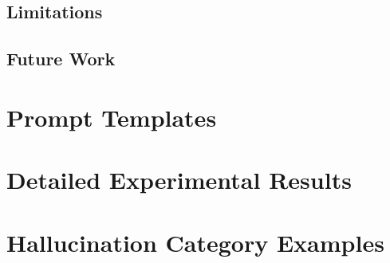 \documentclass[12pt,a4paper,oneside]{report}
\begin{document}
\section{Limitations}
\label{sec:limitations}

\section{Future Work}
\label{sec:future-work}






\appendix

\chapter{Prompt Templates}
\label{app:prompts}

\chapter{Detailed Experimental Results}
\label{app:detailed-results}

\chapter{Hallucination Category Examples}
\label{app:hallucination-examples}
\end{document}
